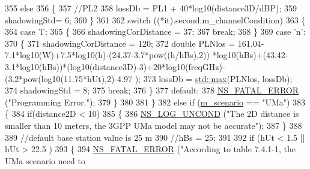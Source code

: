 \begin{DoxyCode}
355                 \textcolor{keywordflow}{else}
356                 \{
357                         \textcolor{comment}{//PL2}
358                         lossDb = PL1 + 40*log10(distance3D/dBP);
359                         shadowingStd= 6;
360                 \}
361 
362                 \textcolor{keywordflow}{switch} ((*it).second.m\_channelCondition)
363                 \{
364                         \textcolor{keywordflow}{case} \textcolor{charliteral}{'l'}:
365                         \{
366                                 shadowingCorDistance = 37;
367                                 \textcolor{keywordflow}{break};
368                         \}
369                         \textcolor{keywordflow}{case} \textcolor{charliteral}{'n'}:
370                         \{
371                                 shadowingCorDistance = 120;
372                                 \textcolor{keywordtype}{double} PLNlos = 161.04-7.1*log10(W)+7.5*log10(h)-(24.37-3.7*pow((h/hBs),2))
      *log10(hBs)+(43.42-3.1*log10(hBs))*(log10(distance3D)-3)+20*log10(freqGHz)-(3.2*pow(log10(11.75*hUt),2)-4.97
      );
373                                 lossDb = \hyperlink{80211b_8c_affe776513b24d84b39af8ab0930fef7f}{std::max}(PLNlos, lossDb);
374                                 shadowingStd = 8;
375                                 \textcolor{keywordflow}{break};
376                         \}
377                         \textcolor{keywordflow}{default}:
378                                 \hyperlink{group__fatal_ga5131d5e3f75d7d4cbfd706ac456fdc85}{NS\_FATAL\_ERROR} (\textcolor{stringliteral}{"Programming Error."});
379                 \}
380 
381         \}
382         \textcolor{keywordflow}{else} \textcolor{keywordflow}{if} (\hyperlink{classMmWave3gppPropagationLossModel_a3ba2b9e45f4d02e49620faf03f97e898}{m\_scenario} == \textcolor{stringliteral}{"UMa"})
383         \{
384                 \textcolor{keywordflow}{if}(distance2D < 10)
385                 \{
386                         \hyperlink{log-macros-disabled_8h_a0b36e5e182b37194f85ef1c5e979fb2e}{NS\_LOG\_UNCOND} (\textcolor{stringliteral}{"The 2D distance is smaller than 10 meters, the 3GPP
       UMa model may not be accurate"});
387                 \}
388 
389                 \textcolor{comment}{//default base station value is 25 m}
390                 \textcolor{comment}{//hBs = 25;}
391 
392                 \textcolor{keywordflow}{if} (hUt < 1.5 || hUt > 22.5 )
393                 \{
394                         \hyperlink{group__fatal_ga5131d5e3f75d7d4cbfd706ac456fdc85}{NS\_FATAL\_ERROR} (\textcolor{stringliteral}{"According to table 7.4.1-1, the UMa scenario need to
}
\end{DoxyCode}
